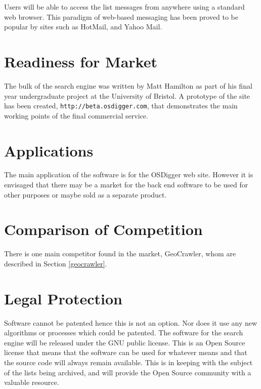 Users will be able to access the list messages from anywhere using a standard web browser.  This paradigm of web-based messaging has been proved to be popular by sites such as HotMail, and Yahoo Mail.

\section{Readiness for Market}

The bulk of the search engine was written by Matt Hamilton as part of his
final year undergraduate project at the University of Bristol.  A
prototype of the site has been created, \texttt{http://beta.osdigger.com}, that demonstrates the main working points of the final commercial service.

\section{Applications}

The main application of the software is for the OSDigger web site.
However it is envisaged that there may be a market for the back end
software to be used for other purposes or maybe sold as a separate
product.

\section{Comparison of Competition}

There is one main competitor found in the market, GeoCrawler, whom are
described in Section \ref{geocrawler}.

\section{Legal Protection}
Software cannot be patented hence this is not an option.  Nor does it use
any new algorithms or processes which could be patented.  The software for
the search engine will be released under the GNU public license.  This is
an Open Source license that means that the software can be used for
whatever means and that the source code will always remain available.  
This is in
keeping with the subject of the lists being archived, and will provide the
Open Source community with a valuable resource.

